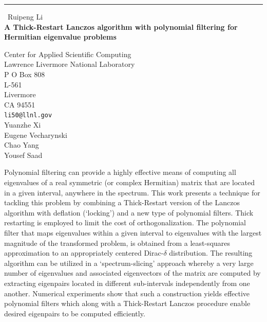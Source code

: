 \documentclass{report}
\begin{document}
\begin{center}
\rule{6in}{1pt} \
{\large Ruipeng Li \\
{\bf A Thick-Restart Lanczos algorithm with polynomial filtering for Hermitian eigenvalue problems}}

Center for Applied Scientific Computing \\ Lawrence Livermore National Laboratory \\ P O Box 808 \\ L-561 \\ Livermore \\ CA 94551
\\
{\tt li50@llnl.gov}\\
Yuanzhe Xi\\
Eugene Vecharynski\\
Chao Yang\\
Yousef Saad\end{center}

Polynomial filtering can provide a highly effective means of computing
all eigenvalues of a real symmetric (or complex Hermitian) matrix that
are located in a given interval, anywhere in the spectrum. This work
presents a technique for tackling this problem by combining a
Thick-Restart version of the Lanczos algorithm with deflation (`locking')
and a new type of polynomial filters. Thick restarting is employed to
limit the cost of orthogonalization. The polynomial filter that maps
eigenvalues within a given interval to eigenvalues with the largest
magnitude of the transformed problem, is obtained from a least-squares
approximation to an appropriately centered Dirac-$\delta$ distribution.
The resulting algorithm
can be utilized in a `spectrum-slicing' approach whereby a
very large number of eigenvalues and associated eigenvectors of the
matrix are computed by extracting eigenpairs located in different
sub-intervals independently from one another. Numerical experiments show
that such a construction yields effective polynomial filters which along
with a Thick-Restart Lanczos procedure enable desired eigenpairs to be
computed efficiently.
\end{document}
